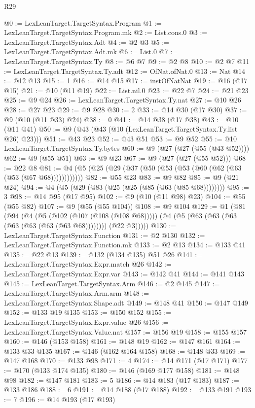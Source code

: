 \begin{lexlean}{R29}
\begin{coremodule}
@0 := LexLeanTarget.TargetSyntax.Program
@1 := LexLeanTarget.TargetSyntax.Program.mk
@2 := List.cons.{0}
@3 := LexLeanTarget.TargetSyntax.Adt
@4 := @2 @3
@5 := LexLeanTarget.TargetSyntax.Adt.mk
@6 := List.{0}
@7 := LexLeanTarget.TargetSyntax.Ty
@8 := @6 @7
@9 := @2 @8
@10 := @2 @7
@11 := LexLeanTarget.TargetSyntax.Ty.adt
@12 := OfNat.ofNat.{0}
@13 := Nat
@14 := @12 @13
@15 := 1
@16 := @14 @15
@17 := instOfNatNat
@19 := @16 (@17 @15)
@21 := @10 (@11 @19)
@22 := List.nil.{0}
@23 := @22 @7
@24 := @21 @23
@25 := @9 @24
@26 := LexLeanTarget.TargetSyntax.Ty.nat
@27 := @10 @26
@28 := @27 @23
@29 := @9 @28
@30 := 2
@33 := @14 @30 (@17 @30)
@37 := @9 (@10 (@11 @33) @24)
@38 := 0
@41 := @14 @38 (@17 @38)
@43 := @10 (@11 @41)
@50 := @9 (@43 (@43 (@10 (LexLeanTarget.TargetSyntax.Ty.list @26) @23)))
@51 := @43 @23
@52 := @43 @51
@53 := @9 @52
@55 := @10 LexLeanTarget.TargetSyntax.Ty.bytes
@60 := @9 (@27 (@27 (@55 (@43 @52))))
@62 := @9 (@55 @51)
@63 := @9 @23
@67 := @9 (@27 (@27 (@55 @52)))
@68 := @22 @8
@81 := @4 (@5 (@25 (@29 (@37 (@50 (@53 (@53 (@60 (@62 (@63 (@53 (@67 @68))))))))))))
@82 := @55 @23
@83 := @9 @82
@85 := @9 (@21 @24)
@94 := @4 (@5 (@29 (@83 (@25 (@25 (@85 (@63 (@85 @68))))))))
@95 := 3
@98 := @14 @95 (@17 @95)
@102 := @9 (@10 (@11 @98) @23)
@104 := @55 (@55 @82)
@107 := @9 (@55 (@55 @104))
@108 := @9 @104
@129 := @1
    (@81
      (@94
        (@4
          (@5 (@102 (@107 (@108 (@108 @68)))))
          (@4 (@5 (@63 (@63 (@63 (@63 (@63 (@63 (@63 @68)))))))) (@22 @3)))))
@130 := LexLeanTarget.TargetSyntax.Function
@131 := @2 @130
@132 := LexLeanTarget.TargetSyntax.Function.mk
@133 := @2 @13
@134 := @133 @41
@135 := @22 @13
@139 := @132 (@134 @135) @51 @26
@141 := LexLeanTarget.TargetSyntax.Expr.match @26
@142 := LexLeanTarget.TargetSyntax.Expr.var
@143 := @142 @41
@144 := @141 @143
@145 := LexLeanTarget.TargetSyntax.Arm
@146 := @2 @145
@147 := LexLeanTarget.TargetSyntax.Arm.arm
@148 := LexLeanTarget.TargetSyntax.Shape.adt
@149 := @148 @41
@150 := @147 @149
@152 := @133 @19 @135
@153 := @150 @152
@155 := LexLeanTarget.TargetSyntax.Expr.value @26
@156 := LexLeanTarget.TargetSyntax.Value.nat
@157 := @156 @19
@158 := @155 @157
@160 := @146 (@153 @158)
@161 := @148 @19
@162 := @147 @161
@164 := @133 @33 @135
@167 := @146 (@162 @164 @158)
@168 := @148 @33
@169 := @147 @168
@170 := @133 @98
@171 := 4
@174 := @14 @171 (@17 @171)
@177 := @170 (@133 @174 @135)
@180 := @146 (@169 @177 @158)
@181 := @148 @98
@182 := @147 @181
@183 := 5
@186 := @14 @183 (@17 @183)
@187 := @133 @186
@188 := 6
@191 := @14 @188 (@17 @188)
@192 := @133 @191
@193 := 7
@196 := @14 @193 (@17 @193)

\end{coremodule}
\end{lexlean}
